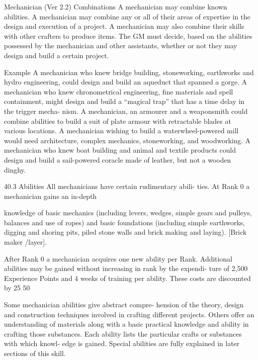 \begin{Chapter}{Mechanician (Ver 2.2)}
Combinations  A  mechanician  may  combine 
known  abilities.  A  mechanician  may  combine  any 
or  all  of  their  areas  of  expertise  in  the  design  and 
execution  of  a  project.  A  mechanician  may  also 
combine  their  skills  with  other  crafters  to  produce 
items. The GM must decide, based on the abilities 
possessed by the mechanician and other assistants, 
whether or not they may design and build a certain 
project. 

Example  
A  mechanician  who  knew  bridge  building, 
stoneworking,  earthworks  and  hydro  engineering,  could 
design  and  build  an  aqueduct  that  spanned  a  gorge.  A 
mechanician  who  knew  chronometrical  engineering,  fine 
materials and spell containment,  might design and build a 
“magical trap” that  has a time delay  in the trigger  mecha-
nism.  A  mechanician,  an  armourer  and  a  weaponsmith 
could combine abilities to build a suit of plate armour with 
retractable  blades  at  various  locations.  A  mechanician 
wishing  to  build  a  waterwheel-powered  mill  would  need 
architecture,  complex  mechanics,  stoneworking,  and 
woodworking.  A  mechanician  who  knew  boat  building 
and  animal  and  textile  products  could  design  and  build  a 
sail-powered  coracle  made  of  leather,  but  not  a  wooden 
dinghy. 

40.3 Abilities 
All  mechanicians  have  certain  rudimentary  abili-
ties.  At  Rank  0  a  mechanician  gains  an  in-depth 

knowledge  of  basic  mechanics  (including  levers, 
wedges, simple gears and pulleys, balances and use 
of  ropes)  and  basic  foundations  (including  simple 
earthworks,  digging  and  shoring  pits,  piled  stone 
walls  and  brick  making  and  laying).  [Brick  maker 
/layer]. 

After  Rank  0  a  mechanician  acquires  one  new 
ability  per  Rank.  Additional  abilities  may  be 
gained  without  increasing  in  rank  by  the  expendi-
ture  of  2,500  Experience  Points  and  4  weeks  of 
training  per  ability.  These  costs  are  discounted  by 
25%
50%

Some  mechanician  abilities  give  abstract  compre-
hension  of  the  theory,  design  and  construction 
techniques  involved  in  crafting  different  projects. 
Others  offer  an  understanding  of  materials  along 
with  a  basic  practical  knowledge  and  ability  in 
crafting  those  substances.  Each  ability  lists  the 
particular  crafts  or  substances  with  which  knowl-
edge is gained. Special abilities are fully explained 
in later sections of this skill. 


\end{Chapter}
